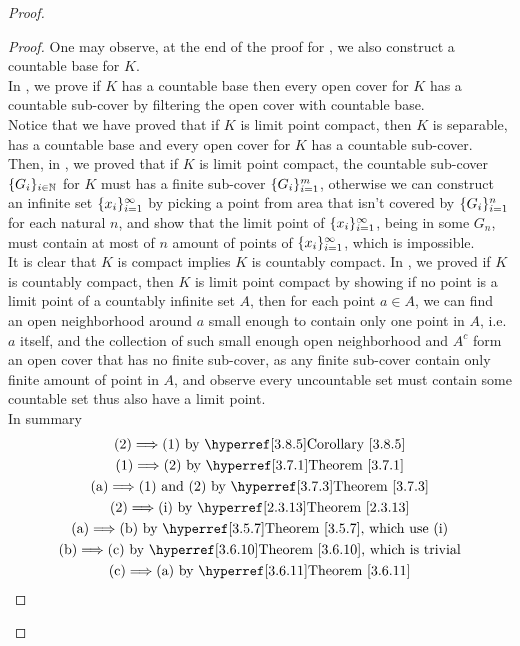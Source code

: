 \documentclass{report}
\begin{document}
\begin{proof}
\begin{proof}
One may observe, at the end of the proof for , we also construct a countable base for $K$.\\

In  , we prove if  $K$ has a countable base then every open cover for  $K$ has a countable sub-cover by filtering the open cover with countable base.\\

Notice that we have proved that if $K$ is limit point compact, then  $K$ is separable, has a countable base and every open cover for  $K$ has a countable sub-cover.\\

Then, in , we proved that if $K$ is limit point compact, the countable sub-cover $\{ G_i \}_{i\in\mathbb{N}}$ for $K$ must has a finite sub-cover $\{ G_i \}_{i=1}^m$, otherwise we can construct an infinite set $\{ x_i \}_{i=1}^\infty$ by picking a point from area that isn't covered by $\{ G_i \}_{i=1}^n$ for each natural $n$, and show that the limit point of $\{ x_i \}_{i=1}^\infty$, being in some $G_n$, must contain at most of  $n$ amount of points of  $\{ x_i \}_{i=1}^\infty$, which is impossible.\\

It is clear that $K$ is compact implies $K$ is countably compact. In  , we proved if $K$ is countably compact, then $K$ is limit point compact by showing if no point is a limit point of a countably infinite set $A$, then for each point $a\in A$, we can find an open neighborhood around $a$ small enough to contain only one point in $A$, i.e.  $a$ itself, and the collection of such small enough open neighborhood and  $A^c$ form an open cover that has no finite sub-cover, as any finite sub-cover contain only finite amount of point in  $A$, and observe every uncountable set must contain some countable set thus also have a limit point.\\

In summary 
\begin{gather}
\text{(2)$\implies $(1) by \myref{Corollary}{3.8.5}}\\
\text{(1)$\implies $(2) by \myref{Theorem}{3.7.1}}\\
\text{(a)$\implies $(1) and (2) by \myref{Theorem}{3.7.3}}\\
\text{(2)$\implies $(i) by \myref{Theorem}{2.3.13}}\\
\text{(a)$\implies $(b) by \myref{Theorem}{3.5.7}, which use  (i)}\\
\text{(b)$\implies$(c) by \myref{Theorem}{3.6.10}, which is trivial}\\
\text{(c)$\implies $(a) by \myref{Theorem}{3.6.11}}
\end{gather}
\end{proof}

\end{proof}
\end{document}
